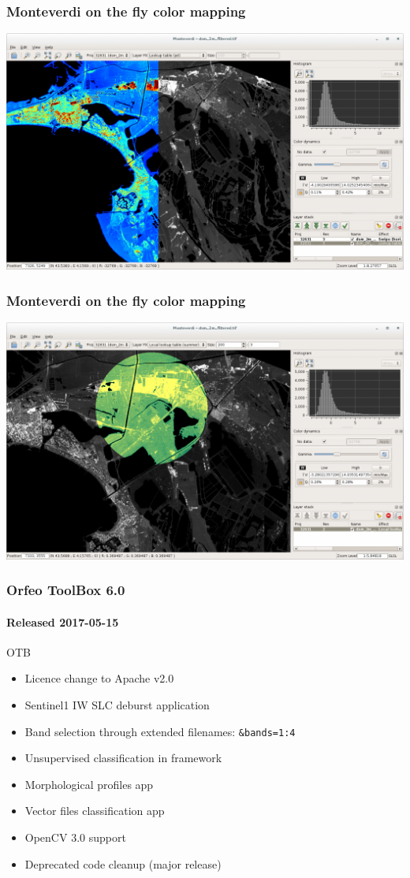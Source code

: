 \documentclass[smaller]{beamer}
\begin{document}
\begin{frame}
\frametitle{Monteverdi on the fly color mapping}
\includegraphics[width=1\textwidth]{images/monteverdi-colormapping.png}
\end{frame}

\begin{frame}
\frametitle{Monteverdi on the fly color mapping}
\includegraphics[width=1\textwidth]{images/monteverdi-colormapping2.png}
\end{frame}



\begin{frame}
\frametitle{Orfeo ToolBox 6.0}
\framesubtitle{Released 2017-05-15}
  \begin{block}{OTB}
    \begin{itemize}
      \item Licence change to  Apache v2.0
      \item Sentinel1 IW SLC deburst application
      \item Band selection through extended filenames: \texttt{\&bands=1:4}
      \item Unsupervised classification in framework
      \item Morphological profiles app
      \item Vector files classification app
      \item OpenCV 3.0 support
      \item Deprecated code cleanup (major release)
    \end{itemize}
    \end{block}
\end{frame}
\end{document}
